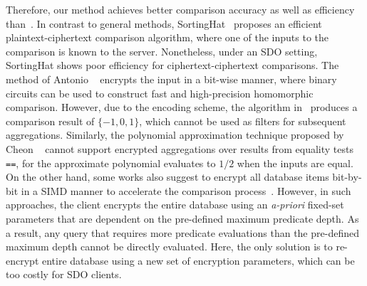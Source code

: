 Therefore, our method achieves better comparison accuracy as well
as efficiency than~\cite{pegasus, largeprecision}. In contrast
to general methods, 
SortingHat~\cite{sortinghat} proposes an efficient plaintext-ciphertext 
comparison algorithm, where one of the inputs to the comparison
is known to the server. Nonetheless, under an SDO setting,
SortingHat shows poor efficiency for ciphertext-ciphertext
comparisons. The method of Antonio \etal~\cite{revisiting} 
encrypts the input in a bit-wise manner, where binary circuits
can be used to construct fast and high-precision
homomorphic comparison. However, due to the encoding scheme, 
the algorithm in~\cite{revisiting} produces
a comparison result of $\{-1,0,1\}$, which cannot be used as
filters for subsequent aggregations.
Similarly, the polynomial approximation technique proposed by 
Cheon \etal~\cite{ckkscomparison} cannot support encrypted 
aggregations over results from equality tests \texttt{==}, for the approximate polynomial evaluates
to $1/2$ when the inputs are equal.
On the other hand, some works also suggest to encrypt all database items bit-by-bit in a
SIMD manner to accelerate the comparison process~\cite{aphadb, khedr2015shield}.
However, in such approaches, the client encrypts the 
entire database using an {\it{a-priori}} fixed-set parameters 
that are dependent on
the pre-defined maximum predicate depth. As a result,
any query that requires more predicate evaluations than the
pre-defined maximum depth cannot be directly
evaluated. Here, the only solution is to re-encrypt
entire database using a new set of encryption parameters, which
can be too costly for SDO clients.





